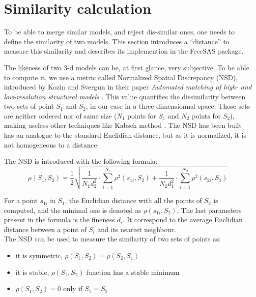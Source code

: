 \documentclass[a4paper, 11pt]{report}
\begin{document}
\section{Similarity calculation}

To be able to merge similar models, and reject dis-similar ones,
one needs to define the similarity of two models. 
This section introduces a ``distance'' to measure this  
similarity and describes its implemention in the FreeSAS
package.

The likeness of two 3-d models can be, at first glance, very 
subjective. 
To be able to compute it, we use a metric called Normalized Spatial 
Discrepancy (NSD), introduced by Kozin and Svergun in their paper 
\textit{Automated matching of high- and low-resolution structural 
models} \cite{supcomb}. 
This value quantifies the dissimilarity between two sets of 
point $S_{1}$ and $S_{2}$, in our case in a three-dimensionnal space.
Those sets are neither ordered nor of same size ($N_{1}$ points for
$S_{1}$ and $N_{2}$ points for
$S_{2}$), making useless other techniques like Kabsch method
\cite{kabsch1976}.
The NSD has been built has an analogue to the standard Euclidian distance,
but as it is normalized, it is not homogeneous to a distance:

The NSD is introduced with the following formula:\\
\[
\rho(S_{1},S_{2})= \frac{1}{2} \sqrt {\frac{1}{N_{1}d_{2}^2} 
\cdot \sum\limits_{i=1}^{N_{1}} \rho^2(s_{1i}, S_{2}) + \frac{1}{N_{2}d_{1}^2} \cdot \sum\limits_{i=1}^{N_{2}} \rho^2(s_{2i}, S_{1})}
\]

For a point $s_{1i}$ in $S_{1}$, the Euclidian distance with all the 
points of $S_{2}$ is computed, and the minimal one is denoted as 
$\rho(s_{1i}, S_{2})$. 
The last parameters present in the formula is the fineness $d_{i}$. 
It correspond to the average Euclidian distance between a point of 
$S_{i}$ and its nearest neighbour.\\
The NSD can be used to measure the similarity of two sets of points as:
\begin{itemize}
 \item it is symmetric, $\rho(S_{1},S_{2}) = \rho(S_{2},S_{1})$
 \item it is stable, $\rho(S_{1},S_{2})$ function has a stable minimum
 \item $\rho(S_{1},S_{2}) = 0$ only if $S_{1} = S_{2}$
\end{itemize}
\end{document}
